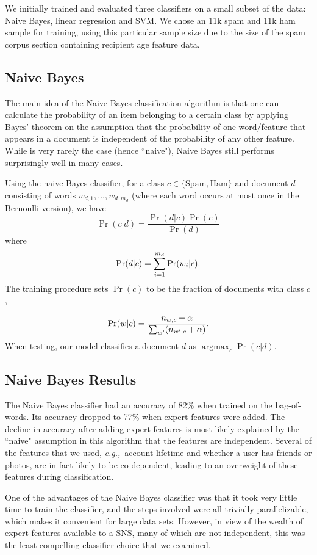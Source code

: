 \documentclass[preprint]{acm_proc_article-sp}
\DeclareMathOperator{\Argmax}{argmax}
\newcommand{\PosC}{\mathrm{Spam}}
\newcommand{\NegC}{\mathrm{Ham}}
\newcommand{\eg}{{\em e.g.,}~}
\begin{document}
We initially trained and evaluated three classifiers on a small subset of the data: 
Naive Bayes, linear regression and SVM.  We chose an 11k spam and 11k ham sample for 
training, using this particular sample size due to the size of the spam corpus 
section containing recipient age feature data.  

\subsection{Naive Bayes}

The main idea of the Naive Bayes classification algorithm is that one can calculate the probability 
of an item belonging to a certain class by applying Bayes' theorem on the assumption that the probability 
of one word/feature that appears in a document is independent of the probability of any other feature. 
While is very rarely the case (hence ``naive"), Naive Bayes still performs surprisingly well in many cases.
 
Using the naive Bayes classifier, for a class \(c \in \{\PosC, \NegC\}\) and document \(d\) consisting of words \(w_{d,1},\dotsc,w_{d,m_d}\) (where each word occurs at most once in the Bernoulli version), we have
\[\Pr(c|d)=\frac{\Pr(d|c)\Pr(c)}{\Pr(d)}\]
where
\[\Pr(d|c)=\sum_{i=1}^{m_d}\Pr(w_i|c)\ldotp\]
The training procedure sets \(\Pr(c)\) to be the fraction of documents with class \(c\),%

\[\Pr(w|c)=\frac{n_{w,c}+\alpha}{\sum_{w'}(n_{w',c}+\alpha)}\ldotp\]
When testing, our model classifies a document \(d\) as \(\Argmax_c\Pr(c|d)\).

\subsection{Naive Bayes Results}

The Naive Bayes classifier had an accuracy of 82\% when trained on the bag-of-words. Its accuracy dropped 
to 77\% when expert features were added. The decline in accuracy after adding expert features is most likely 
explained by the ``naive" assumption in this algorithm that the features are independent. Several of 
the features that we used, \eg{account lifetime and whether a user has friends or photos}, are in 
fact likely to be co-dependent, leading to an overweight of these features during classification. 

One of the advantages of the Naive Bayes classifier was that it took very little time to train the classifier, 
and the steps involved were all trivially parallelizable, which makes it convenient for large data sets. 
However, in view of the wealth of expert features available to a SNS, many of which are not independent, this was 
the least compelling classifier choice that we examined.
\end{document}
